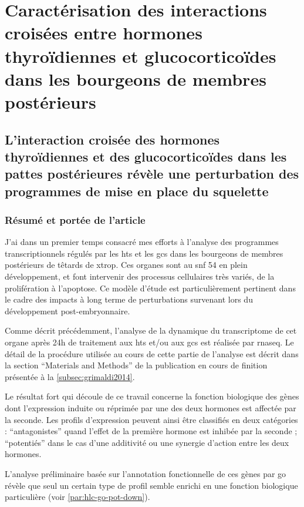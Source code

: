 \documentclass[../main.tex]{subfiles}
\begin{document}
\chapter{Caractérisation des interactions croisées entre hormones thyroïdiennes et glucocorticoïdes dans les bourgeons de membres postérieurs}



\section{L'interaction croisée des hormones thyroïdiennes et des glucocorticoïdes dans les pattes postérieures révèle une perturbation des programmes de mise en place du squelette}

	\subsection{Résumé et portée de l'article}\label{subsec:grimaldi2014}
	J'ai dans un premier temps consacré mes efforts à l'analyse des programmes transcriptionnels régulés par les \glspl{ht} et les \glspl{gc} dans les bourgeons de membres postérieurs de têtards de \gls{xtrop}.
	Ces organes sont au \gls{snf} 54 en plein développement, et font intervenir des processus cellulaires très variés, de la prolifération à l'apoptose.
	Ce modèle d'étude est particulièrement pertinent dans le cadre des impacts à long terme de perturbations survenant lors du développement post-embryonnaire.
	\par
	Comme décrit précédemment, l'analyse de la dynamique du transcriptome de cet organe après 24h de traitement aux \glspl{ht} et/ou aux \glspl{gc} est réalisée par \gls{rnaseq}.
	Le détail de la procédure utilisée au cours de cette partie de l'analyse est décrit dans la section ``Materials and Methods'' de la publication en cours de finition présentée à la \autoref{subsec:grimaldi2014}.
	\par
	Le résultat fort qui découle de ce travail concerne la fonction biologique des gènes dont l'expression induite ou réprimée par une des deux hormones est affectée par la seconde.
	Les profils d'expression peuvent ainsi être classifiés en deux catégories :
	``antagonistes'' quand l'effet de la première hormone est inhibée par la seconde ; ``potentiés'' dans le cas d'une additivité ou une synergie d'action entre les deux hormones.
	\par
	L'analyse préliminaire basée sur l'annotation fonctionnelle de ces gènes par \gls{go} révèle que seul un certain type de profil semble enrichi en une fonction biologique particulière (voir \autoref{par:hlc-go-pot-down}).
\end{document}
